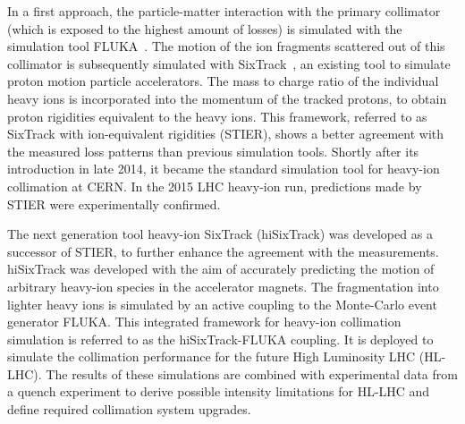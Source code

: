 In a first approach, the particle-matter interaction with the primary collimator (which is exposed to the highest amount of losses) is simulated with the simulation tool FLUKA~\cite{ferrari2005fluka,bohlen2014fluka}. The motion of the ion fragments scattered out of this collimator is subsequently simulated with SixTrack~\cite{SixTrackref01,SixTrackref03,SixTrackref02,SixTrackref04}, an existing tool to simulate proton motion particle accelerators. The mass to charge ratio of the individual heavy ions is incorporated into the momentum of the tracked protons, to obtain proton rigidities equivalent to the heavy ions.  This framework, referred to as SixTrack with ion-equivalent rigidities (STIER), shows a better agreement with the measured loss patterns than previous simulation tools. Shortly after its introduction in late 2014, it became the standard simulation tool for heavy-ion collimation at CERN. In the 2015 LHC heavy-ion run,  predictions made by STIER were experimentally confirmed. 
\vspace{0.2cm}

\newpage
The next generation tool heavy-ion SixTrack (hiSixTrack) was developed as a successor of STIER, to further enhance the agreement with the measurements. hiSixTrack was developed with the aim of accurately predicting the motion of arbitrary heavy-ion species in the accelerator magnets. The fragmentation into lighter heavy ions is simulated by an active coupling to the Monte-Carlo event generator FLUKA. This integrated framework for heavy-ion collimation simulation is referred to as the hiSixTrack-FLUKA coupling. It is deployed to simulate the collimation performance for the future High Luminosity LHC (HL-LHC). The results of these simulations are combined with experimental data from a quench experiment to derive possible intensity limitations for HL-LHC and define required collimation system upgrades.
\vspace{0.2cm}








